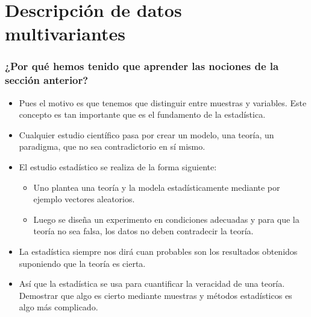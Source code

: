 \section{Descripción de datos multivariantes}
 \begin{frame}
 \frametitle{¿Por qué hemos tenido que aprender las nociones de la sección anterior?}
 \begin{itemize}
\item Pues el motivo es que tenemos que distinguir entre muestras y variables. Este concepto es tan importante que es el fundamento de la estadística.
 
\item Cualquier estudio científico pasa por crear un modelo, una teoría, un paradigma, que no sea contradictorio en sí mismo.

\end{itemize}


\end{frame}
\begin{frame}

\begin{itemize}
\item El estudio estadístico se realiza de la forma siguiente:  

\begin{itemize}
\item Uno plantea una teoría y la modela estadísticamente mediante por ejemplo vectores aleatorios.
\item Luego se  diseña un experimento en condiciones adecuadas y para que la teoría no sea falsa, los datos no deben contradecir la teoría. 
\end{itemize}

\item La estadística siempre nos dirá cuan probables son los resultados obtenidos suponiendo que la teoría es cierta. 

\item Así que la estadística se usa para cuantificar la veracidad de una teoría. Demostrar que algo  es cierto mediante muestras y métodos estadísticos es algo más complicado.
 
\end{itemize}
 \end{frame}
 

